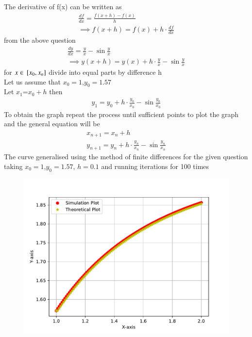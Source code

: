 \documentclass[journal]{IEEEtran}
\begin{document}
The derivative of f(x) can be written as 
\begin{align}
    \frac{df}{dx}=\frac{f(x+h)-f(x)}{h}\\
    \implies f(x+h)=f(x)+h\cdot\frac{df}{dx}
\end{align}
from the above question 
\begin{align}
    \frac{dy}{dx}=\frac{y}{x}-\sin{\frac{y}{x}}\\
    \implies y(x+h)=y(x)+h\cdot \frac{y}{x}-\sin{\frac{y}{x}}
\end{align}
for $x \in {}\left[x_{0},x_{n}\right]$ divide into equal parts by difference h\\
Let us assume that $x_{0}=1$,$y_{0}=1.57$\\
Let $x_{1}$=$x_{0}+h$ then 
\begin{align}
    y_{1}=y_{0}+h\cdot \frac{y_{0}}{x_{0}}-\sin{\frac{y_{0}}{x_{0}}}
\end{align}
 To obtain the graph repeat the process until sufficient points to plot the graph and the general equation will be 
\begin{align}
    x_{n+1}=x_{n}+h\\
    y_{n+1}=y_{n}+h\cdot \frac{y_{n}}{x_{n}}-\sin{\frac{y_{n}}{x_{n}}}
\end{align}
The curve generalised using the method of finite differences for the given question taking $x_{0}=1$,$y_{0}=1.57$, $h=0.1$ and running iterations for 100 times
\begin{figure}[h!]
   \centering
   \includegraphics[width=0.7\columnwidth]{figs/fig.pdf}
\end{figure}
\end{document}
